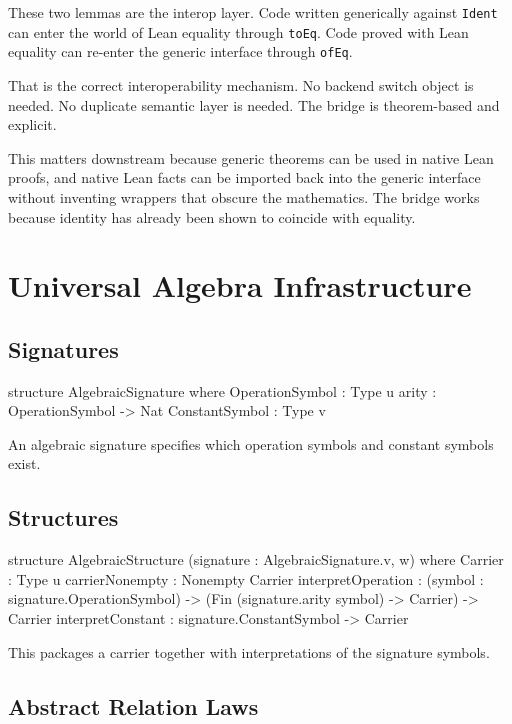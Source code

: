\documentclass[11pt]{article}
\newcommand{\leaninline}[1]{\texttt{#1}}
\begin{document}
These two lemmas are the interop layer. Code written generically against \leaninline{Ident} can enter the world of Lean equality through \leaninline{toEq}. Code proved with Lean equality can re-enter the generic interface through \leaninline{ofEq}.

That is the correct interoperability mechanism. No backend switch object is needed. No duplicate semantic layer is needed. The bridge is theorem-based and explicit.

This matters downstream because generic theorems can be used in native Lean proofs, and native Lean facts can be imported back into the generic interface without inventing wrappers that obscure the mathematics. The bridge works because identity has already been shown to coincide with equality.

\section{Universal Algebra Infrastructure}

\subsection{Signatures}

\begin{leanblock}
structure AlgebraicSignature where
  OperationSymbol : Type u
  arity : OperationSymbol -> Nat
  ConstantSymbol : Type v
\end{leanblock}

An algebraic signature specifies which operation symbols and constant symbols exist.

\subsection{Structures}

\begin{leanblock}
structure AlgebraicStructure (signature : AlgebraicSignature.{v, w}) where
  Carrier : Type u
  carrierNonempty : Nonempty Carrier
  interpretOperation :
    (symbol : signature.OperationSymbol) ->
      (Fin (signature.arity symbol) -> Carrier) -> Carrier
  interpretConstant : signature.ConstantSymbol -> Carrier
\end{leanblock}

This packages a carrier together with interpretations of the signature symbols.

\subsection{Abstract Relation Laws}
\end{document}
